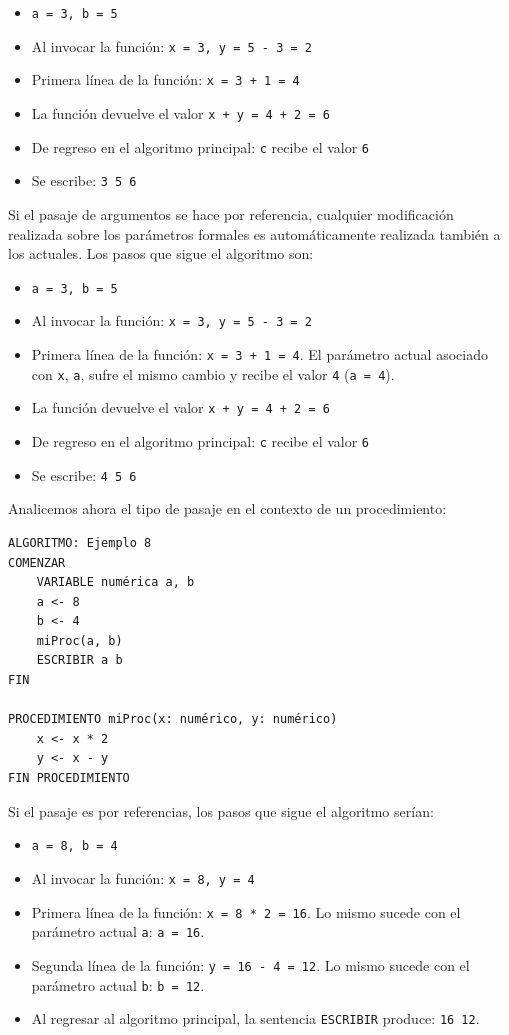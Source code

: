 \documentclass[]{book}
\providecommand{\tightlist}{%
  \setlength{\itemsep}{0pt}\setlength{\parskip}{0pt}}
\begin{document}
\begin{itemize}
\tightlist
\item
  \texttt{a\ =\ 3,\ b\ =\ 5}
\item
  Al invocar la función: \texttt{x\ =\ 3,\ y\ =\ 5\ -\ 3\ =\ 2}
\item
  Primera línea de la función: \texttt{x\ =\ 3\ +\ 1\ =\ 4}
\item
  La función devuelve el valor \texttt{x\ +\ y\ =\ 4\ +\ 2\ =\ 6}
\item
  De regreso en el algoritmo principal: \texttt{c} recibe el valor \texttt{6}
\item
  Se escribe: \texttt{3\ 5\ 6}
\end{itemize}

Si el pasaje de argumentos se hace por referencia, cualquier modificación realizada sobre los parámetros formales es automáticamente realizada también a los actuales. Los pasos que sigue el algoritmo son:

\begin{itemize}
\tightlist
\item
  \texttt{a\ =\ 3,\ b\ =\ 5}
\item
  Al invocar la función: \texttt{x\ =\ 3,\ y\ =\ 5\ -\ 3\ =\ 2}
\item
  Primera línea de la función: \texttt{x\ =\ 3\ +\ 1\ =\ 4}. El parámetro actual asociado con \texttt{x}, \texttt{a}, sufre el mismo cambio y recibe el valor \texttt{4} (\texttt{a\ =\ 4}).
\item
  La función devuelve el valor \texttt{x\ +\ y\ =\ 4\ +\ 2\ =\ 6}
\item
  De regreso en el algoritmo principal: \texttt{c} recibe el valor \texttt{6}
\item
  Se escribe: \texttt{4\ 5\ 6}
\end{itemize}

Analicemos ahora el tipo de pasaje en el contexto de un procedimiento:

\begin{verbatim}
ALGORITMO: Ejemplo 8
COMENZAR
    VARIABLE numérica a, b
    a <- 8
    b <- 4
    miProc(a, b)
    ESCRIBIR a b
FIN

PROCEDIMIENTO miProc(x: numérico, y: numérico)
    x <- x * 2
    y <- x - y
FIN PROCEDIMIENTO
\end{verbatim}

Si el pasaje es por referencias, los pasos que sigue el algoritmo serían:

\begin{itemize}
\tightlist
\item
  \texttt{a\ =\ 8,\ b\ =\ 4}
\item
  Al invocar la función: \texttt{x\ =\ 8,\ y\ =\ 4}
\item
  Primera línea de la función: \texttt{x\ =\ 8\ *\ 2\ =\ 16}. Lo mismo sucede con el parámetro actual \texttt{a}: \texttt{a\ =\ 16}.
\item
  Segunda línea de la función: \texttt{y\ =\ 16\ -\ 4\ =\ 12}. Lo mismo sucede con el parámetro actual \texttt{b}: \texttt{b\ =\ 12}.
\item
  Al regresar al algoritmo principal, la sentencia \texttt{ESCRIBIR} produce: \texttt{16\ 12}.
\end{itemize}
\end{document}
